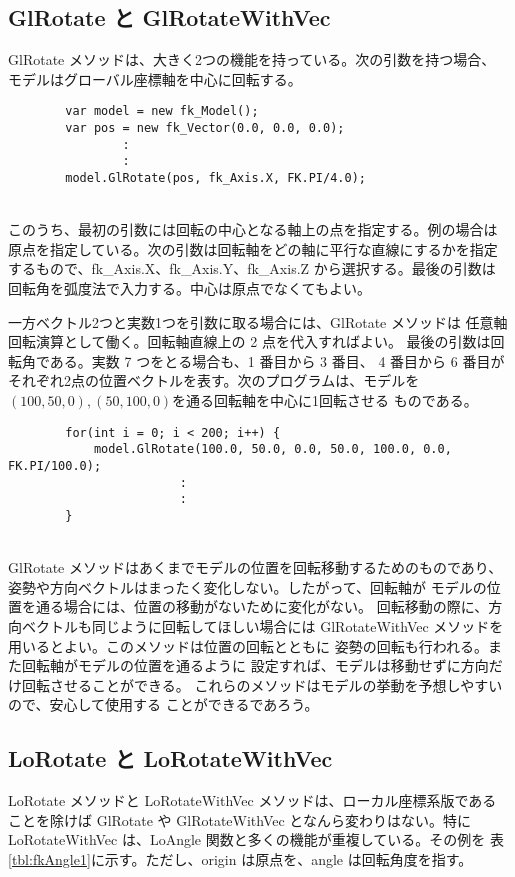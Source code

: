 \subsection{GlRotate と GlRotateWithVec}
GlRotate メソッドは、大きく2つの機能を持っている。次の引数を持つ場合、
モデルはグローバル座標軸を中心に回転する。
\\
\begin{breakbox}
\begin{verbatim}
        var model = new fk_Model();
        var pos = new fk_Vector(0.0, 0.0, 0.0);
                :
                :
        model.GlRotate(pos, fk_Axis.X, FK.PI/4.0);
\end{verbatim}
\end{breakbox}
~ \\
このうち、最初の引数には回転の中心となる軸上の点を指定する。例の場合は
原点を指定している。次の引数は回転軸をどの軸に平行な直線にするかを指定
するもので、fk\_Axis.X、fk\_Axis.Y、fk\_Axis.Z から選択する。最後の引数は
回転角を弧度法で入力する。中心は原点でなくてもよい。

一方ベクトル2つと実数1つを引数に取る場合には、GlRotate メソッドは
任意軸回転演算として働く。回転軸直線上の 2 点を代入すればよい。
最後の引数は回転角である。実数 7 つをとる場合も、1 番目から 3 番目、
4 番目から 6 番目がそれぞれ2点の位置ベクトルを表す。次のプログラムは、モデルを
\((100, 50, 0), (50, 100, 0)\)を通る回転軸を中心に1回転させる
ものである。
\\
\begin{breakbox}
\begin{verbatim}
        for(int i = 0; i < 200; i++) {
            model.GlRotate(100.0, 50.0, 0.0, 50.0, 100.0, 0.0, FK.PI/100.0);
                        :
                        :
        }
\end{verbatim}
\end{breakbox}
~ \\
GlRotate メソッドはあくまでモデルの位置を回転移動するためのものであり、
姿勢や方向ベクトルはまったく変化しない。したがって、回転軸が
モデルの位置を通る場合には、位置の移動がないために変化がない。
回転移動の際に、方向ベクトルも同じように回転してほしい場合には
GlRotateWithVec メソッドを用いるとよい。このメソッドは位置の回転とともに
姿勢の回転も行われる。また回転軸がモデルの位置を通るように
設定すれば、モデルは移動せずに方向だけ回転させることができる。
これらのメソッドはモデルの挙動を予想しやすいので、安心して使用する
ことができるであろう。

\subsection{LoRotate と LoRotateWithVec}
LoRotate メソッドと LoRotateWithVec メソッドは、ローカル座標系版である
ことを除けば GlRotate や GlRotateWithVec となんら変わりはない。特に
LoRotateWithVec は、LoAngle 関数と多くの機能が重複している。その例を
表\ref{tbl:fkAngle1}に示す。ただし、origin は原点を、angle は回転角度を指す。

